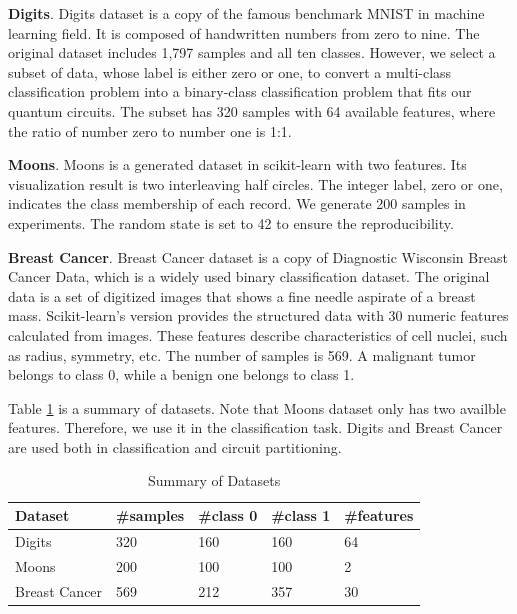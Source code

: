 \documentclass[sigconf]{acmart}
\begin{document}
\vspace{0.2cm}
\noindent\textbf{Digits}. Digits dataset is a copy of the famous benchmark MNIST in machine learning field. It is composed of handwritten numbers from zero to nine. The original dataset includes 1,797 samples and all ten classes. However, we select a subset of data, whose label is either zero or one, to convert a multi-class classification problem into a binary-class classification problem that fits our quantum circuits. The subset has 320 samples with 64 available features, where the ratio of number zero to number one is 1:1.

\vspace{0.2cm}
\noindent\textbf{Moons}. Moons is a generated dataset in scikit-learn with two features. Its visualization result is two interleaving half circles. The integer label, zero or one, indicates the class membership of each record. We generate 200 samples in experiments. The random state is set to 42 to ensure the reproducibility.

\vspace{0.2cm}
\noindent\textbf{Breast Cancer}. Breast Cancer dataset is a copy of Diagnostic Wisconsin Breast Cancer Data, which is a widely used binary classification dataset. The original data is a set of digitized images that shows a fine needle aspirate of a breast mass. Scikit-learn's version provides the structured data with 30 numeric features calculated from images. These features describe characteristics of cell nuclei, such as radius, symmetry, etc. The number of samples is 569. A malignant tumor belongs to class 0, while a benign one belongs to class 1.

\vspace{0.2cm}
Table \ref{tab:datasets} is a summary of datasets. Note that Moons dataset only has two availble features. Therefore, we use it in the classification task. Digits and Breast Cancer are used both in classification and circuit partitioning.

\begin{table}[!ht]
    \centering
    \caption{Summary of Datasets}
    \label{tab:datasets}
    \begin{tabular}{lllll}
        \toprule
        \textbf{Dataset} & \textbf{\#samples} & \textbf{\#class 0} & \textbf{\#class 1} & \textbf{\#features}\\
        \midrule
        Digits & 320 & 160 & 160 & 64\\
        Moons & 200 & 100 & 100 & 2\\
        Breast Cancer & 569 & 212 & 357 & 30\\
        \bottomrule
    \end{tabular}
\end{table}
\end{document}
